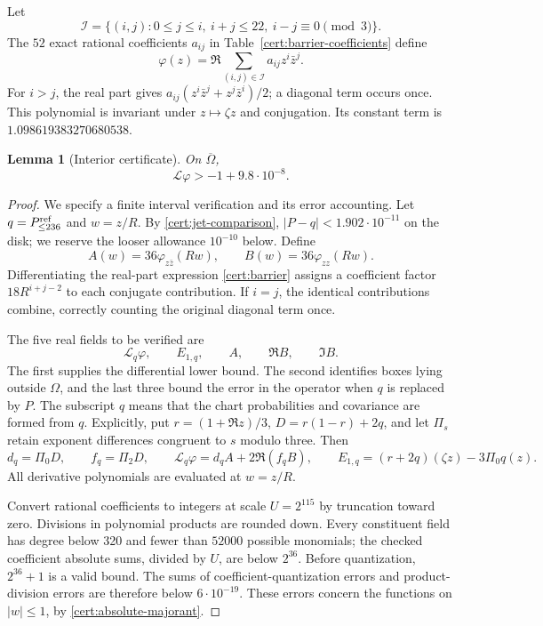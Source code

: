 \documentclass[11pt]{article}
\numberwithin{equation}{section}
\newtheorem{lemma}[theorem]{Lemma}
\theoremstyle{definition}
\theoremstyle{remark}
\begin{document}
Let
\[
 \mathcal I=\{(i,j):0\leq j\leq i,\ i+j\leq22,\ i-j\equiv0\pmod3\}.
\]
The $52$ exact rational coefficients $a_{ij}$ in
Table~\ref{cert:barrier-coefficients} define
\begin{equation}\label{cert:barrier}
 \varphi(z)=\Re\sum_{(i,j)\in\mathcal I}a_{ij}z^i\bar z^j.
\end{equation}
For $i>j$, the real part gives
$a_{ij}(z^i\bar z^j+z^j\bar z^i)/2$; a diagonal term occurs once.
This polynomial is invariant under $z\mapsto\zeta z$
and conjugation.  Its constant term is $1.098619383270680538$.

\begin{lemma}[Interior certificate]\label{cert:interior-lemma}
On $\overline\Omega$,
\[
 \mathcal L\varphi>-1+9.8\cdot10^{-8}.
\]
\end{lemma}
\begin{proof}
We specify a finite interval verification and its error accounting.  Let
$q=P^{\rm ref}_{\leq236}$ and $w=z/R$.  By
\eqref{cert:jet-comparison}, $|P-q|<1.902\cdot10^{-11}$ on the disk;
we reserve the looser allowance $10^{-10}$ below.  Define
\[
 A(w)=36\varphi_{z\bar z}(Rw),\qquad B(w)=36\varphi_{zz}(Rw).
\]
Differentiating the real-part expression \eqref{cert:barrier} assigns a
coefficient factor $18R^{i+j-2}$ to each conjugate contribution.  If $i=j$,
the identical contributions combine, correctly counting the original
diagonal term once.

The five real fields to be verified are
\begin{equation}\label{cert:five-fields}
 \mathcal L_q\varphi,\qquad E_{1,q},\qquad A,\qquad \Re B,\qquad\Im B.
\end{equation}
The first supplies the differential lower bound.  The second identifies
boxes lying outside $\Omega$, and the last three bound the error in the
operator when $q$ is replaced by $P$.
The subscript $q$ means that the chart probabilities and covariance are
formed from $q$.  Explicitly, put $r=(1+\Re z)/3$,
$D=r(1-r)+2q$, and let $\Pi_s$ retain exponent differences congruent to
$s$ modulo three.  Then
\[
 d_q=\Pi_0D,\qquad f_q=\Pi_2D,\qquad
 \mathcal L_q\varphi=d_qA+2\Re(f_qB),\qquad
 E_{1,q}=(r+2q)(\zeta z)-3\Pi_0q(z).
\]
All derivative polynomials are evaluated at $w=z/R$.

Convert rational coefficients to integers at scale $U=2^{115}$ by
truncation toward zero.  Divisions in polynomial products are rounded down.
Every constituent field has degree below 320 and fewer than $52000$
possible monomials; the checked coefficient absolute sums, divided by $U$,
are below $2^{36}$.  Before quantization, $2^{36}+1$ is a valid bound.
The sums of coefficient-quantization errors and product-division errors
are therefore below $6\cdot10^{-19}$.  These errors concern the functions
on $|w|\leq1$, by \eqref{cert:absolute-majorant}.


\end{proof}
\end{document}
